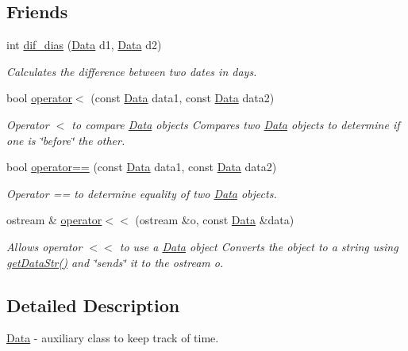 \subsection*{Friends}
\begin{DoxyCompactItemize}
\item 
int \hyperlink{class_data_a950a6321928619d329831ee195416f79}{dif\+\_\+dias} (\hyperlink{class_data}{Data} d1, \hyperlink{class_data}{Data} d2)
\begin{DoxyCompactList}\small\item\em Calculates the difference between two dates in days. \end{DoxyCompactList}\item 
bool \hyperlink{class_data_a301f290080098e5d3983bdf4e870c3b9}{operator$<$} (const \hyperlink{class_data}{Data} data1, const \hyperlink{class_data}{Data} data2)
\begin{DoxyCompactList}\small\item\em Operator $<$ to compare \hyperlink{class_data}{Data} objects Compares two \hyperlink{class_data}{Data} objects to determine if one is \char`\"{}before\char`\"{} the other. \end{DoxyCompactList}\item 
bool \hyperlink{class_data_a3cf90128ca701a628213a73c2ae1d5ea}{operator==} (const \hyperlink{class_data}{Data} data1, const \hyperlink{class_data}{Data} data2)
\begin{DoxyCompactList}\small\item\em Operator == to determine equality of two \hyperlink{class_data}{Data} objects. \end{DoxyCompactList}\item 
ostream \& \hyperlink{class_data_a9daa61b4e0bee256d9481803c4778000}{operator$<$$<$} (ostream \&o, const \hyperlink{class_data}{Data} \&data)
\begin{DoxyCompactList}\small\item\em Allows operator $<$$<$ to use a \hyperlink{class_data}{Data} object Converts the object to a string using \hyperlink{class_data_a2a9f0b2202a6bf68215d3e06dc3cb57e}{get\+Data\+Str()} and \char`\"{}sends\char`\"{} it to the ostream o. \end{DoxyCompactList}\end{DoxyCompactItemize}


\subsection{Detailed Description}
\hyperlink{class_data}{Data} -\/ auxiliary class to keep track of time. 

